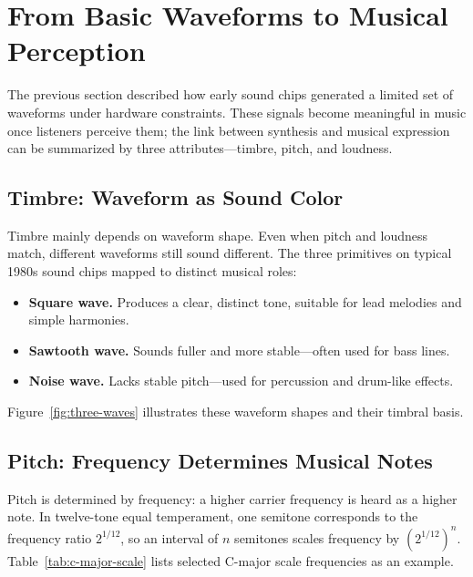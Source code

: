 \section{From Basic Waveforms to Musical Perception}
\label{sec:perception}

The previous section described how early sound chips generated a limited set of waveforms under hardware constraints.
These signals become meaningful in music once listeners perceive them; the link between synthesis and musical expression can be summarized by three attributes---timbre, pitch, and loudness.

\subsection{Timbre: Waveform as Sound Color}

Timbre mainly depends on waveform shape.
Even when pitch and loudness match, different waveforms still sound different.
The three primitives on typical 1980s sound chips mapped to distinct musical roles:

\begin{itemize}
  \item \textbf{Square wave.} Produces a clear, distinct tone, suitable for lead melodies and simple harmonies.
  \item \textbf{Sawtooth wave.} Sounds fuller and more stable---often used for bass lines.
  \item \textbf{Noise wave.} Lacks stable pitch---used for percussion and drum-like effects.
\end{itemize}

Figure~\ref{fig:three-waves} illustrates these waveform shapes and their timbral basis.

\subsection{Pitch: Frequency Determines Musical Notes}

Pitch is determined by frequency: a higher carrier frequency is heard as a higher note.
In twelve-tone equal temperament, one semitone corresponds to the frequency ratio $2^{1/12}$, so an interval of $n$ semitones scales frequency by $(2^{1/12})^n$.
Table~\ref{tab:c-major-scale} lists selected C-major scale frequencies as an example.

